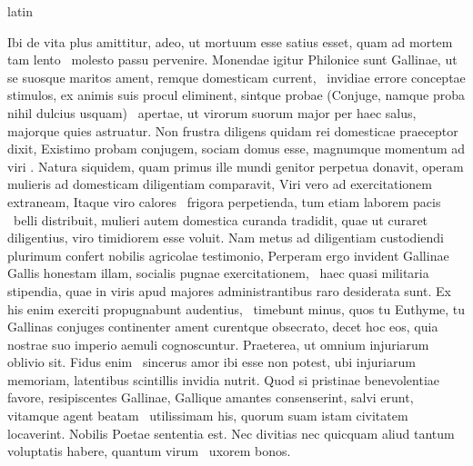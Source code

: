 \documentclass[12pt]{book}
\renewenvironment{latin}
    	{\begin{hyphenrules}{latin}}
    	{\end{hyphenrules}}
\begin{document}
\begin{pages}
\begin{latin}
\begin{Leftside}
                    Ibi de vita  plus amittitur, adeo, ut mortuum esse satius esset, quam ad mortem tam lento ﻿\ampersand\ molesto passu pervenire. 
                    Monendae igitur Philonice sunt Gallinae, ut se suosque maritos ament, remque domesticam current, ﻿\ampersand\ invidiae errore conceptae stimulos, 
                    ex animis suis procul eliminent, sintque probae (Conjuge, namque proba nihil  dulcius usquam) ﻿\ampersand\ apertae, 
                    ut virorum suorum major per haec salus, majorque quies astruatur. 
                    Non frustra diligens quidam rei domesticae praeceptor dixit, 
                    Existimo probam conjugem, sociam domus esse, magnumque momentum ad viri . 
                    Natura siquidem, quam primus ille mundi genitor perpetua  donavit, operam mulieris ad domesticam diligentiam comparavit, 
                    Viri vero ad exercitationem extraneam, 
                    Itaque viro calores ﻿\ampersand\ frigora perpetienda, 
                    tum   etiam laborem pacis ﻿\ampersand\ belli distribuit, mulieri autem domestica  curanda tradidit, 
                    quae ut curaret diligentius, viro timidiorem esse voluit. 
                    Nam metus ad diligentiam custodiendi plurimum confert nobilis agricolae testimonio, 
                    Perperam ergo invident Gallinae Gallis honestam illam, socialis pugnae exercitationem, ﻿\ampersand\ haec quasi militaria stipendia, 
                    quae in viris  apud majores administrantibus raro desiderata sunt. 
                    Ex his enim exerciti propugnabunt audentius, ﻿\ampersand\ timebunt minus, 
                    quos tu Euthyme, tu Gallinas conjuges continenter ament curentque obsecrato, decet hoc eos, 
                    quia  nostrae suo imperio aemuli cognoscuntur. 
                    Praeterea, ut omnium injuriarum oblivio sit. 
                    Fidus enim ﻿\ampersand\ sincerus amor ibi esse non potest, ubi injuriarum memoriam, latentibus scintillis invidia nutrit. 
                    Quod si pristinae benevolentiae favore, resipiscentes Gallinae, Gallique amantes consenserint, salvi erunt, vitamque agent beatam ﻿\ampersand\ utilissimam his, 
                    quorum  suam istam civitatem locaverint. 
                    Nobilis Poetae sententia est. Nec divitias nec quicquam aliud tantum voluptatis habere, quantum virum ﻿\ampersand\ uxorem bonos. 

\end{Leftside}
\end{latin}
\end{pages}
\end{document}
